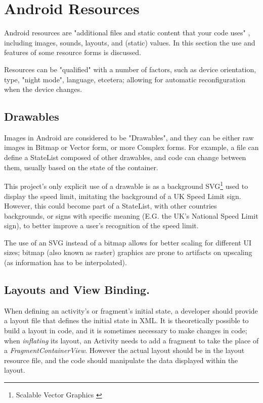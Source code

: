 \documentclass[11pt, a4paper, notitlepage]{report}
\begin{document}
\section{Android Resources}
Android resources are "additional files and static content that your code uses" \citep{resourcesAndroid}, including images, sounds, layouts, and (static) values. In this section the use and features of some resource forms is discussed.

Resources can be "qualified" with a number of factors, such as device orientation, type, "night mode", language, etcetera; allowing for automatic reconfiguration when the device changes.

\subsection{Drawables}
Images in Android are considered to be "Drawables", and they can be either raw images in Bitmap or Vector form, or more Complex forms. For example, a file can define a StateList composed of other drawables, and code can change between them, usually based on the state of the container.

This project's only explicit use of a drawable is as a background SVG\footnote{Scalable Vector Graphics \citep{SVGW3C}} used to display the speed limit, imitating the background of a UK Speed Limit sign. However, this could become part of a StateList, with other countries backgrounds, or signs with specific meaning (E.G. the UK's National Speed Limit sign), to better improve a user's recognition of the speed limit.

The use of an SVG instead of a bitmap allows for better scaling for different UI sizes; bitmap (also known as raster) graphics are prone to artifacts on upscaling (as information has to be interpolated).

\subsection{Layouts and View Binding.}
When defining an activity's or fragment's initial state, a developer should provide a layout file that defines the initial state in XML. It is theoretically possible to build a layout in code, and it is sometimes necessary to make changes in code; when \textit{inflating} its layout, an Activity needs to add a fragment to take the place of a \textit{FragmentContainerView}. However the actual layout should be in the layout resource file, and the code should manipulate the data displayed within the layout.
\end{document}
